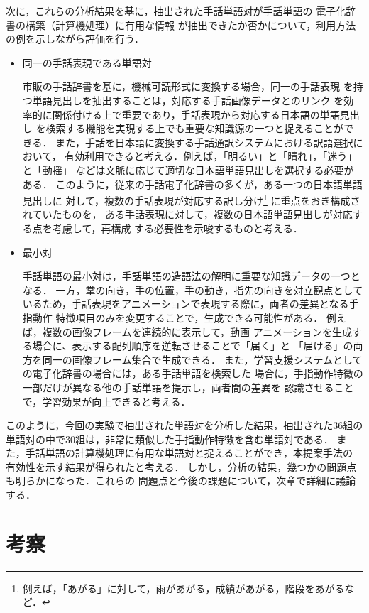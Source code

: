 次に，これらの分析結果を基に，抽出された手話単語対が手話単語の
電子化辞書の構築（計算機処理）に有用な情報
が抽出できたか否かについて，利用方法の例を示しながら評価を行う．

\begin{itemize}
\item 同一の手話表現である単語対

市販の手話辞書を基に，機械可読形式に変換する場合，同一の手話表現
を持つ単語見出しを抽出することは，対応する手話画像データとのリンク
を効率的に関係付ける上で重要であり，手話表現から対応する日本語の単語見出し
を検索する機能を実現する上でも重要な知識源の一つと捉えることができる．
また，手話を日本語に変換する手話通訳システムにおける訳語選択において，
有効利用できると考える．例えば，「明るい」と「晴れ」，「迷う」と「動揺」
などは文脈に応じて適切な日本語単語見出しを選択する必要がある．
このように，従来の手話電子化辞書の多くが，ある一つの日本語単語見出しに
対して，複数の手話表現が対応する訳し分け\footnote{
例えば，「あがる」に対して，雨があがる，成績があがる，階段をあがるなど．}
に重点をおき構成されていたものを，
ある手話表現に対して，複数の日本語単語見出しが対応する点を考慮して，再構成
する必要性を示唆するものと考える．

\item 最小対

手話単語の最小対は，手話単語の造語法の解明に重要な知識データの一つとなる．
一方，掌の向き，手の位置，手の動き，指先の向きを対立観点として
いるため，手話表現をアニメーションで表現する際に，両者の差異となる手指動作
特徴項目のみを変更することで，生成できる可能性がある．
例えば，複数の画像フレームを連続的に表示して，動画
アニメーションを生成する場合に、表示する配列順序を逆転させることで「届く」と
「届ける」の両方を同一の画像フレーム集合で生成できる．
また，学習支援システムとしての電子化辞書の場合には，ある手話単語を検索した
場合に，手指動作特徴の一部だけが異なる他の手話単語を提示し，両者間の差異を
認識させることで，学習効果が向上できると考える．

\end{itemize}

このように，今回の実験で抽出された単語対を分析した結果，抽出された36組の
単語対の中で30組は，非常に類似した手指動作特徴を含む単語対である．
また，手話単語の計算機処理に有用な単語対と捉えることができ，本提案手法の
有効性を示す結果が得られたと考える．
しかし，分析の結果，幾つかの問題点も明らかになった．これらの
問題点と今後の課題について，次章で詳細に議論する．

\section {考察}\label{kousatu} 

